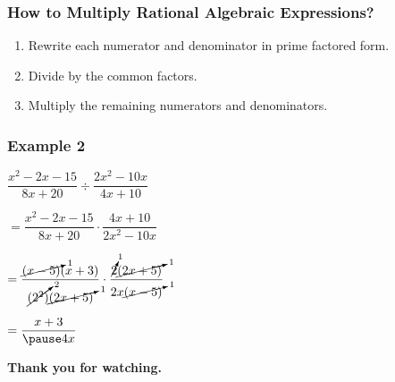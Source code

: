 \documentclass[14pt]{beamer}
\begin{document}
   \begin{frame}
   	\frametitle{How to Multiply Rational Algebraic Expressions?}
   	\begin{enumerate}
   		\item Rewrite each numerator and denominator in prime factored form.
   		\item Divide by the common factors.
   		\item Multiply the remaining numerators and denominators.
   	\end{enumerate}
   \end{frame}

    \begin{frame}
    	\frametitle{Example 2}
    	$\dfrac{x^2 - 2x - 15}{8x + 20} \div \dfrac{2x^2 - 10x}{4x + 10}$ 
    	
    	\vspace{1em}$ =  \dfrac{x^2 - 2x - 15}{8x + 20} \cdot \dfrac{4x + 10}{2x^2 - 10x}$
    	
    	\vspace{1em}$ =  \dfrac{\cancelto{1}{(x-5)}(x + 3)}{\cancelto{2}{(2^2)} \cancelto{1}{(2x + 5)}} \cdot \dfrac{\cancelto{1}{2} \cancelto{1}{(2x + 5)}}{ 2x \cancelto{1}{(x-5)}}  $
    	
    	\pause \vspace{1em}$ =  \dfrac{x + 3}{\pause 4x} $
    \end{frame}
	
    \begin{frame}
    	\begin{center}
    		\textbf{\LARGE Thank you for watching.}
    	\end{center}
    \end{frame}
	
\end{document}
